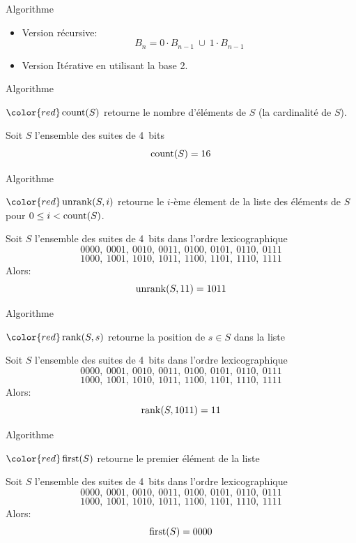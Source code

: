 \documentclass{beamer}
\def\red{\color{red}}
\begin{document}
\begin{frame}{Algorithme \List}

  \begin{itemize}
  \item Version récursive:
    \[ B_n = 0\cdot B_{n-1}\ \cup\ 1\cdot B_{n-1}\]
    \pause\bigskip

  \item Version Itérative en utilisant la base 2.
  \end{itemize}
\end{frame}

\begin{frame}{Algorithme \Count}
\begin{ALGO}[{{\red\Count}}]
${\red\Count(S)}$ retourne le nombre d'éléments de $S$ (la cardinalité de
$S$).
\end{ALGO}
\bigskip\pause
Soit $S$ l'ensemble des suites de 4~bits
\medskip\pause
$$\operatorname{count}(S) = 16$$
\end{frame}

\begin{frame}{Algorithme \Unrank}
\begin{ALGO}[{{\red\Unrank}}]
${\red\Unrank(S, i)}$ retourne le $i$-ème élement de la liste des éléments de
$S$ pour $0\leq i < \operatorname{count}(S)$.
\end{ALGO}
\medskip\pause
Soit $S$ l'ensemble des suites de 4~bits dans l'ordre lexicographique
\[ 0000,\ 0001,\ 0010,\ 0011,\ 0100,\ 0101,\ 0110,\ 0111 \]
\[ 1000,\ 1001,\ 1010,\ 1011,\ 1100,\ 1101,\ 1110,\ 1111 \]
\medskip
Alors:
$$\operatorname{unrank}(S, 11) = 1011$$
\end{frame}

\begin{frame}{Algorithme \Rank}
\begin{ALGO}[{{\red\Rank}}]
${\red\Rank(S, s)}$ retourne la position de $s \in S$ dans la liste
\end{ALGO}
\medskip\pause
Soit $S$ l'ensemble des suites de 4~bits dans l'ordre lexicographique
\[ 0000,\ 0001,\ 0010,\ 0011,\ 0100,\ 0101,\ 0110,\ 0111 \]
\[ 1000,\ 1001,\ 1010,\ 1011,\ 1100,\ 1101,\ 1110,\ 1111 \]
\medskip
Alors:
$$\operatorname{rank}(S, 1011) = 11$$
\end{frame}

\begin{frame}{Algorithme \First}
\begin{ALGO}[{{\red\First}}]
${\red\First(S)}$ retourne le premier élément de la liste
\end{ALGO}
\medskip\pause
Soit $S$ l'ensemble des suites de 4~bits dans l'ordre lexicographique
\[ 0000,\ 0001,\ 0010,\ 0011,\ 0100,\ 0101,\ 0110,\ 0111 \]
\[ 1000,\ 1001,\ 1010,\ 1011,\ 1100,\ 1101,\ 1110,\ 1111 \]
\medskip
Alors:
$$\operatorname{first}(S) = 0000$$
\end{frame}
\end{document}

